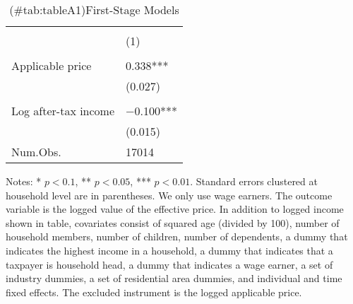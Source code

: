 \begin{table}

\caption{(\#tab:tableA1)First-Stage Models\label{tab:main-stage1}}
\centering
\fontsize{8}{10}\selectfont
\begin{threeparttable}
\begin{tabular}[t]{l>{\centering\arraybackslash}p{18.75em}}
\toprule
\multicolumn{1}{c}{ } & \multicolumn{1}{c}{Effective price} \\
\cmidrule(l{3pt}r{3pt}){2-2}
  & (1)\\
\midrule
\addlinespace[0.3em]
\multicolumn{2}{l}{\textit{Excluded instruments}}\\
\hspace{1em}Applicable price & \num{0.338}***\\
\hspace{1em} & (\num{0.027})\\
\addlinespace[0.3em]
\multicolumn{2}{l}{\textit{Covariates}}\\
\hspace{1em}Log after-tax income & \num{-0.100}***\\
\hspace{1em} & (\num{0.015})\\
\midrule
Num.Obs. & \num{17014}\\
\bottomrule
\end{tabular}
\begin{tablenotes}
\item Notes: * $p < 0.1$, ** $p < 0.05$, *** $p < 0.01$. Standard errors clustered at household level are in parentheses. We only use wage earners. The outcome variable is the logged value of the effective price. In addition to logged income shown in table, covariates consist of squared age (divided by 100), number of household members, number of children, number of dependents, a dummy that indicates the highest income in a household, a dummy that indicates that a taxpayer is household head, a dummy that indicates a wage earner, a set of industry dummies, a set of residential area dummies, and individual and time fixed effects. The excluded instrument is the logged applicable price.
\end{tablenotes}
\end{threeparttable}
\end{table}
